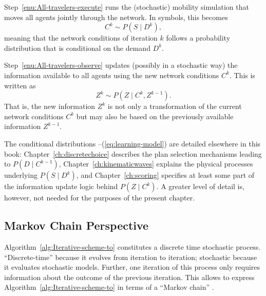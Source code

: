 
Step~\ref{enu:All-travelers-execute} runs the (stochastic) mobility
simulation that moves all agents jointly through the network. In symbols,
this becomes
\begin{equation}
C^{k}\sim P(S\mid D^{k}),\label{eq:network-loading-model}
\end{equation}
meaning that the network conditions of iteration $k$ follows a probability
distribution that is conditional on the demand $D^{k}$. 

Step~\ref{enu:All-travelers-observe} updates (possibly in a stochastic
way) the information available to all agents using the new network
conditions $C^{k}$. This is written as
\begin{equation}
Z^{k}\sim P(Z\mid C^{k},Z^{k-1}).\label{eq:learning-model}
\end{equation}
That is, the new information $Z^{k}$ is not only a transformation
of the current network conditions $C^{k}$ but may also be based on
the previously available information $Z^{k-1}$.

The conditional distributions --(\ref{eq:learning-model})
are detailed elsewhere in this book: Chapter~\ref{ch:discretechoice} 
describes the plan selection mechanisms leading to $P(D\mid C^{k-1})$,
Chapter~\ref{ch:kinematicwaves} explains the physical processes underlying
$P(S\mid D^{k})$, and Chapter~\ref{ch:scoring}
specifies at least some part of the information update logic behind $P(Z\mid C^{k})$. A greater level of detail is, however, not needed for the purposes of the present chapter.


\subsection{\label{sub:Markov-chain-perspective}Markov Chain Perspective}

Algorithm~\ref{alg:Iterative-scheme-to} constitutes a discrete time
stochastic process. {}``Discrete-time'' because it evolves from
iteration to iteration; stochastic because it evaluates stochastic
models. Further, one iteration of this process only requires information
about the outcome of the previous iteration. This allows to express
Algorithm~\ref{alg:Iterative-scheme-to} in terms of a {}``Markov
chain'' \citep{ross-2006}.

